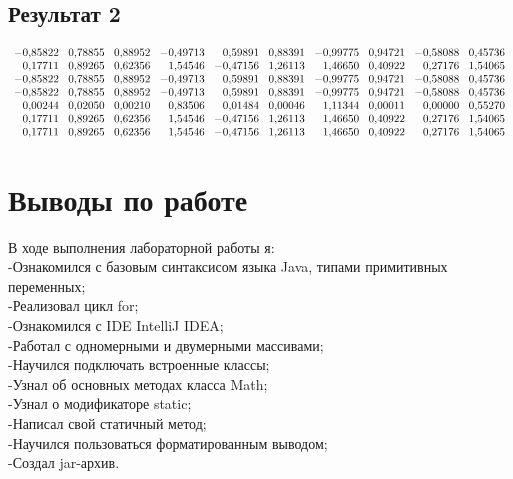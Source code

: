 \subsection{Результат 2}
\[
\normalsize
\begin{array}{r@{\hspace{0.3cm}}r@{\hspace{0.3cm}}r@{\hspace{0.3cm}}r@{\hspace{0.3cm}}r@{\hspace{0.3cm}}r@{\hspace{0.3cm}}r@{\hspace{0.3cm}}r@{\hspace{0.3cm}}r@{\hspace{0.3cm}}r}
 -0{,}85822 & 0{,}78855 & 0{,}88952 & -0{,}49713 & 0{,}59891 & 0{,}88391 & -0{,}99775 & 0{,}94721 & -0{,}58088 & 0{,}45736 \\ 
 0{,}17711 & 0{,}89265 & 0{,}62356 & 1{,}54546 & -0{,}47156 & 1{,}26113 & 1{,}46650 & 0{,}40922 & 0{,}27176 & 1{,}54065 \\ -0{,}85822 & 0{,}78855 & 0{,}88952 & -0{,}49713 & 0{,}59891 & 0{,}88391 & -0{,}99775 & 0{,}94721 & -0{,}58088 & 0{,}45736 \\ 
 -0{,}85822 & 0{,}78855 & 0{,}88952 & -0{,}49713 & 0{,}59891 & 0{,}88391 & -0{,}99775 & 0{,}94721 & -0{,}58088 & 0{,}45736 \\ 
 0{,}00244 & 0{,}02050 & 0{,}00210 & 0{,}83506 & 0{,}01484 & 0{,}00046 & 1{,}11344 & 0{,}00011 & 0{,}00000 & 0{,}55270 \\ 0{,}17711 & 0{,}89265 & 0{,}62356 & 1{,}54546 & -0{,}47156 & 1{,}26113 & 1{,}46650 & 0{,}40922 & 0{,}27176 & 1{,}54065 \\ 0{,}17711 & 0{,}89265 & 0{,}62356 & 1{,}54546 & -0{,}47156 & 1{,}26113 & 1{,}46650 & 0{,}40922 & 0{,}27176 & 1{,}54065
\end{array}
\]

\section{Выводы по работе}
\Large
В ходе выполнения лабораторной работы я: \\
-Ознакомился с базовым синтаксисом языка Java, типами примитивных переменных; \\
-Реализовал цикл for; \\
-Ознакомился с IDE IntelliJ IDEA; \\
-Работал с одномерными и двумерными массивами; \\
-Научился подключать встроенные классы; \\
-Узнал об основных методах класса Math; \\
-Узнал о модификаторе static; \\
-Написал свой статичный метод; \\
-Научился пользоваться форматированным выводом; \\
-Создал jar-архив.
